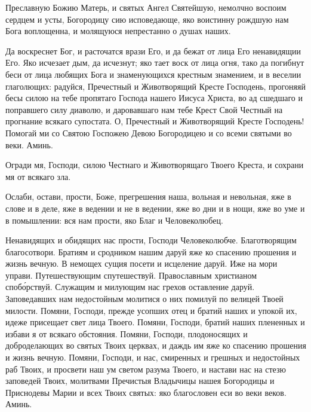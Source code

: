 \begin{mymulticols}
\inynen

 Преславную Божию Матерь, и святых Ангел Святейшую, немолчно воспоим сердцем и усты, Богородицу сию исповедающе, яко воистинну рождшую нам Бога воплощенна, и молящуюся непрестанно о душах наших.


Да воскреснет Бог, и расточатся врази Его, и да бежат от лица Его ненавидящии Его. Яко исчезает дым, да исчезнут; яко тает воск от лица огня, тако да погибнут беси от лица любящих Бога и знаменующихся крестным знамением, и в веселии глаголющих: радуйся, Пречестный и Животворящий Кресте Господень, прогоняяй бесы силою на тебе пропятаго Господа нашего Иисуса Христа, во ад сшедшаго и поправшего силу диаволю, и даровавшаго нам тебе Крест Свой Честный на прогнание всякаго супостата. О, Пречестный и Животворящий Кресте Господень! Помогай ми со Святою Госпожею Девою Богородицею и со всеми святыми во веки. Аминь.


Огради мя, Господи, силою Честнаго и Животворящаго Твоего Креста, и сохрани мя от всякаго зла.


Ослаби, остави, прости, Боже, прегрешения наша, вольная и невольная, яже в слове и в деле, яже в ведении и не в ведении, яже во дни и в нощи, яже во уме и в помышлении: вся нам прости, яко Благ и Человеколюбец.


Ненавидящих и обидящих нас прости, Господи Человеколюбче. Благотворящим благосотвори. Братиям и сродником нашим даруй яже ко спасению прошения и жизнь вечную. В немощех сущия посети и исцеление даруй. Иже на мори управи. Путешествующим спутешествуй. Православным христианом споб\'{о}рствуй. Служащим и милующим нас грехов оставление даруй. Заповедавших нам недостойным молитися о них помилуй по велицей Твоей милости. Помяни, Господи, прежде усопших отец и братий наших и упокой их, идеже присещает свет лица Твоего. Помяни, Господи, братий наших плененных и избави я от всякаго обстояния. Помяни, Господи, плодоносящих и доброделающих во святых Твоих церквах, и даждь им яже ко спасению прошения и жизнь вечную. Помяни, Господи, и нас, смиренных и грешных и недостойных раб Твоих, и просвети наш ум светом разума Твоего, и настави нас на стезю заповедей Твоих, молитвами Пречистыя Владычицы нашея Богородицы и Приснодевы Марии и всех Твоих святых: яко благословен еси во веки веков. Аминь.


\end{mymulticols}
